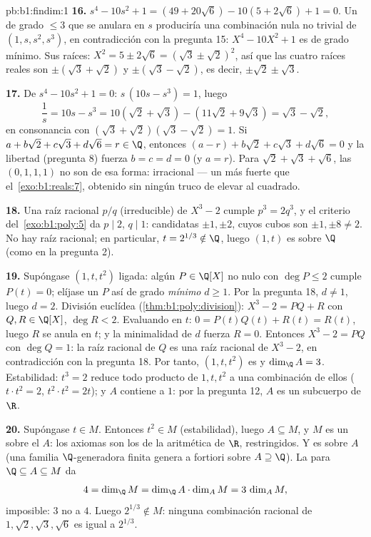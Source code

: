 \begin{solution}{pb:b1:findim:1}
\textbf{16.} $s^4 - 10s^2 + 1 = (49 + 20\sqrt6) - 10(5 + 2\sqrt6) +
1 = 0$. Un  de grado $\leq 3$ que se anulara en $s$
produciría una combinación nula no trivial de $(1, s, s^2, s^3)$, en
contradicción con la pregunta 15: $X^4 - 10X^2 + 1$ es de grado
mínimo. Sus raíces: $X^2 = 5 \pm 2\sqrt6 = (\sqrt3 \pm \sqrt2)^2$,
así que las cuatro raíces reales son $\pm(\sqrt3 + \sqrt2)$ y
$\pm(\sqrt3 - \sqrt2)$, es decir, $\pm\sqrt2 \pm \sqrt3$.

\textbf{17.} De $s^4 - 10s^2 + 1 = 0$: $s\,(10s - s^3) = 1$, luego
\[
\frac1s = 10s - s^3 = 10(\sqrt2 + \sqrt3) - (11\sqrt2 + 9\sqrt3)
= \sqrt3 - \sqrt2 ,
\]
en consonancia con $(\sqrt3 + \sqrt2)(\sqrt3 - \sqrt2) = 1$. Si
$a + b\sqrt2 + c\sqrt3 + d\sqrt6 = r \in \Q$, entonces
$(a - r) + b\sqrt2 + c\sqrt3 + d\sqrt6 = 0$ y la libertad
(pregunta 8) fuerza $b = c = d = 0$ (y $a = r$). Para
$\sqrt2 + \sqrt3 + \sqrt6$, las  $(0, 1, 1, 1)$ no son de
esa forma: irracional --- un  más fuerte que
el~\cref{exo:b1:reals:7}, obtenido sin ningún truco de elevar al
cuadrado.

\textbf{18.} Una raíz racional $p/q$ (irreducible) de $X^3 - 2$ cumple
$p^3 = 2q^3$, y el criterio del~\cref{exo:b1:poly:5} da $p \mid 2$,
$q \mid 1$: candidatas $\pm1, \pm2$, cuyos cubos son
$\pm1, \pm8 \neq 2$. No hay raíz racional; en particular,
$t = 2^{1/3} \notin \Q$, luego $(1, t)$ es  sobre $\Q$ (como en
la pregunta 2).

\textbf{19.} Supóngase $(1, t, t^2)$ ligada: algún $P \in \Q[X]$ no
nulo con $\deg P \leq 2$ cumple $P(t) = 0$; elíjase un $P$ así de grado
\emph{mínimo} $d \geq 1$. Por la pregunta 18, $d \neq 1$, luego
$d = 2$. División euclídea (\cref{thm:b1:poly:division}):
$X^3 - 2 = PQ + R$ con $Q, R \in \Q[X]$, $\deg R < 2$. Evaluando en
$t$: $0 = P(t)Q(t) + R(t) = R(t)$, luego $R$ se anula en $t$; y la
minimalidad de $d$ fuerza $R = 0$. Entonces $X^3 - 2 = PQ$ con
$\deg Q = 1$: la raíz racional de $Q$ es una raíz racional de
$X^3 - 2$, en contradicción con la pregunta 18. Por tanto,
$(1, t, t^2)$ es  y $\dim_\Q A = 3$. Estabilidad: $t^3 = 2$
reduce todo producto de $1, t, t^2$ a una combinación de ellos
($t\cdot t^2 = 2$, $t^2\cdot t^2 = 2t$); y $A$ contiene a $1$: por la
pregunta 12, $A$ es un subcuerpo de $\R$.

\textbf{20.} Supóngase $t \in M$. Entonces $t^2 \in M$ (estabilidad),
luego $A \subseteq M$, y $M$ es un  sobre el 
$A$: los axiomas son los de la aritmética de $\R$, restringidos. Y es
 sobre $A$ (una familia $\Q$-generadora finita
genera a fortiori sobre $A \supseteq \Q$). La  para
$\Q \subseteq A \subseteq M$ da
\[
4 = \dim_\Q M = \dim_\Q A \cdot \dim_A M = 3\,\dim_A M ,
\]
imposible: $3$ no  a $4$. Luego $2^{1/3} \notin M$: ninguna
combinación racional de $1, \sqrt2, \sqrt3, \sqrt6$ es igual a
$2^{1/3}$.


\end{solution}
